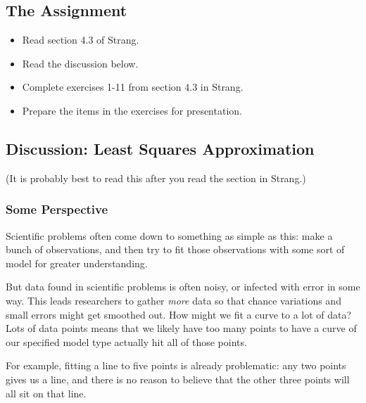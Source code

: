 \documentclass[10pt,]{book}
\theoremstyle{plain}
\theoremstyle{definition}
\numberwithin{equation}{section}
\begin{document}
\subsection[The Assignment]{The Assignment}\label{subsection-104}
\begin{itemize}
\item{}Read section 4.3 of Strang.\item{}Read the discussion below.\item{}Complete exercises 1-11 from section 4.3 in Strang.\item{}Prepare the items in the exercises for presentation.\end{itemize}
\typeout{************************************************}
\typeout{************************************************}
\subsection[Discussion: Least Squares Approximation]{Discussion: Least Squares Approximation}\label{subsection-105}

      (It is probably best to read this after you read the section in Strang.)
\typeout{************************************************}
\typeout{************************************************}
\subsubsection[Some Perspective]{Some Perspective}\label{subsubsection-44}

        Scientific problems often come down to something as simple as this: make
        a bunch of observations, and then try to fit those observations with
        some sort of model for greater understanding.
\par

        But data found in scientific problems is often noisy, or infected with
        error in some way. This leads researchers to gather \emph{more} data
        so that chance variations and small errors might get smoothed out.  How
        might we fit a curve to a lot of data? Lots of data points means that we
        likely have too many points to have a curve of our specified model type
        actually hit all of those points.
\par

        For example, fitting a line to five points is already problematic: any
        two points gives us a line, and there is no reason to believe that the
        other three points will all sit on that line.
\par
\end{document}
